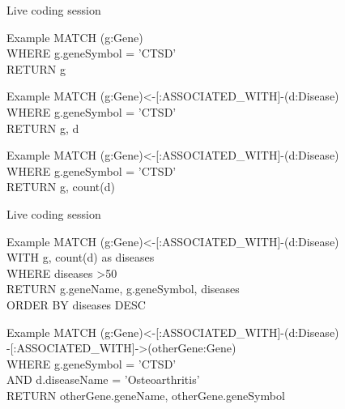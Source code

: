 \documentclass[12pt]{beamer}
\begin{document}
    \begin{frame}{Live coding session}
        \begin{block}{Example}
            MATCH (g:Gene)\\ 
            \hspace{1cm} WHERE g.geneSymbol = 'CTSD'\\
            \hspace{1cm} RETURN g
        \end{block}
        \begin{block}{Example}
            MATCH (g:Gene)\textless-[:ASSOCIATED\_WITH]-(d:Disease)\\
            \hspace{1cm} WHERE g.geneSymbol = 'CTSD'\\
            \hspace{1cm} RETURN g, d\\
        \end{block}
        \begin{block}{Example}
            MATCH (g:Gene)\textless-[:ASSOCIATED\_WITH]-(d:Disease)\\
            \hspace{1cm} WHERE g.geneSymbol = 'CTSD'\\
            \hspace{1cm} RETURN g, count(d)\\
        \end{block}
    \end{frame}
    
    \begin{frame}{Live coding session}
        \begin{block}{Example}
            MATCH (g:Gene)\textless-[:ASSOCIATED\_WITH]-(d:Disease)\\
            \hspace{1cm} WITH g, count(d) as diseases\\
            \hspace{1cm} WHERE diseases \textgreater 50\\
            \hspace{1cm} RETURN g.geneName, g.geneSymbol, diseases\\
            \hspace{1cm} ORDER BY diseases DESC
        \end{block}
        \begin{block}{Example}
            MATCH (g:Gene)\textless-[:ASSOCIATED\_WITH]-(d:Disease)\\
            \hspace{1cm}-[:ASSOCIATED\_WITH]-\textgreater(otherGene:Gene)\\
            \hspace{1cm} WHERE g.geneSymbol = 'CTSD'\\
            \hspace{1cm} AND d.diseaseName = 'Osteoarthritis'\\
            RETURN otherGene.geneName, otherGene.geneSymbol
        \end{block}
    \end{frame}
    
\end{document}
